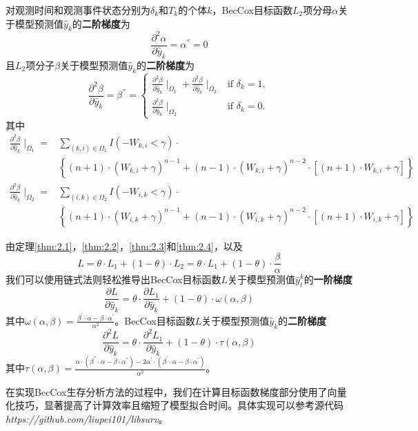 \begin{theorem}\label{thm:2.4}
对观测时间和观测事件状态分别为$\delta_k$和$T_k$的个体$k$，BecCox目标函数$L_2$项分母$\alpha$关于模型预测值$\hat{y}_k$的\textbf{二阶梯度}为$$
\frac{\partial^2 \alpha}{\partial \hat{y}_k}=\alpha^{''}=0
$$ 且$L_2$项分子$\beta$关于模型预测值$\hat{y}_k$的\textbf{二阶梯度}为$$
\frac{\partial^2 \beta}{\partial \hat{y}_k}=\beta^{''}=
\begin{cases}
\frac{\partial^2 \beta}{\partial \hat{y}_k} \mid_{\Omega_1} + \frac{\partial^2 \beta}{\partial \hat{y}_k} \mid_{\Omega_2} & \text{if } \delta_k = 1,\\
\frac{\partial^2 \beta}{\partial \hat{y}_k} \mid_{\Omega_2} & \text{if } \delta_k = 0.
\end{cases}
$$ 其中\[
\begin{split}
\frac{\partial^2 \beta}{\partial \hat{y}_k} \mid_{\Omega_1} =& \sum\limits_{(k,i)\in \Omega_1} I(-W_{k,i}<\gamma)\cdot \\
  & \left\{(n+1)\cdot (W_{k,i}+\gamma)^{n-1} + (n-1)\cdot (W_{k,i}+\gamma)^{n-2}\cdot [(n+1)\cdot W_{k,i}+\gamma]\right\} \\
\frac{\partial^2 \beta}{\partial \hat{y}_k} \mid_{\Omega_2} =& \sum\limits_{(i,k)\in \Omega_2} I(-W_{i,k}<\gamma)\cdot \\
  & \left\{(n+1)\cdot (W_{i,k}+\gamma)^{n-1} + (n-1)\cdot (W_{i,k}+\gamma)^{n-2}\cdot [(n+1)\cdot W_{i,k}+\gamma]\right\}
\end{split}
\]
\end{theorem}

由定理\ref{thm:2.1}，\ref{thm:2.2}，\ref{thm:2.3}和\ref{thm:2.4}，以及$$
L=\theta\cdot L_1 + (1-\theta)\cdot L_2= \theta\cdot L_1 + (1-\theta)\cdot \frac{\beta}{\alpha}
$$ 我们可以使用链式法则轻松推导出BecCox目标函数$L$关于模型预测值$\hat{y}_t^k$的\textbf{一阶梯度}$$
\frac{\partial L}{\partial \hat{y}_k}=\theta\cdot \frac{\partial L_1}{\partial \hat{y}_k} + (1-\theta)\cdot \omega(\alpha, \beta)
$$ 其中$\omega(\alpha, \beta)=\frac{\beta^{'}\cdot \alpha - \beta\cdot \alpha^{'}}{\alpha^2}$。BecCox目标函数$L$关于模型预测值$\hat{y}_k$的\textbf{二阶梯度}$$
\frac{\partial^2 L}{\partial \hat{y}_k}=\theta\cdot \frac{\partial^2 L_1}{\partial \hat{y}_k} + (1-\theta)\cdot \tau(\alpha, \beta)
$$ 其中$\tau(\alpha, \beta)=\frac{\alpha\cdot (\beta^{''}\cdot \alpha - \beta\cdot \alpha^{''})-2\alpha^{'}\cdot (\beta^{'}\cdot \alpha - \beta\cdot \alpha^{'})}{\alpha^3}$。

在实现BecCox生存分析方法的过程中，我们在计算目标函数梯度部分使用了向量化技巧，显著提高了计算效率且缩短了模型拟合时间。具体实现可以参考源代码\emph{https://github.com/liupei101/libsurv}。

